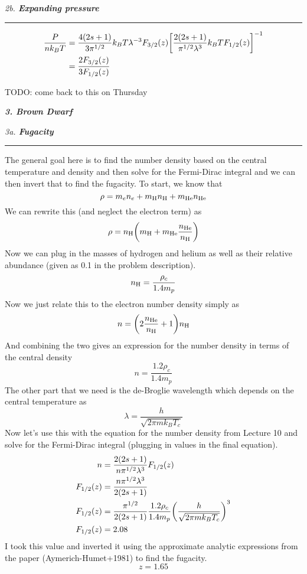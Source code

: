 \documentclass[12pt, letterpaper, twoside]{article}
\newcommand{\question}[1]{{\noindent \it #1}}
\newcommand{\answer}[1]{
    \par\noindent\rule{\textwidth}{0.4pt}#1\vspace{0.5cm}
}
\newcommand{\todo}[1]{{\color{red}\begin{center}TODO: #1\end{center}}}
\begin{document}
\question{2b. \textbf{Expanding pressure}}
\answer{
    \begin{align}
        \frac{P}{n k_B T} &= \frac{4(2s + 1)}{3 \pi^{1/2}} k_B T \lambda^{-3} F_{3/2}(z) \qty[\frac{2(2s + 1)}{\pi^{1/2} \lambda^3} k_B T F_{1/2}(z)]^{-1} \\
                          &= \frac{2 F_{3/2}(z)}{3 F_{1/2}(z)}
    \end{align}
    \todo{come back to this on Thursday}
}

\question{\textbf{3. Brown Dwarf}}

\question{3a. \textbf{Fugacity}}
\answer{
    The general goal here is to find the number density based on the central temperature and density and then solve for the Fermi-Dirac integral and we can then invert that to find the fugacity. To start, we know that
    \begin{equation}
        \rho = m_e n_e + m_{\rm H} n_{\rm H} + m_{\rm He} n_{\rm He}
    \end{equation}
    We can rewrite this (and neglect the electron term) as
    \begin{equation}
        \rho = n_{\rm H} \qty(m_{\rm H} + m_{\rm He} \frac{n_{\rm He}}{n_{\rm H}})
    \end{equation}
    Now we can plug in the masses of hydrogen and helium as well as their relative abundance (given as 0.1 in the problem description).
    \begin{equation}
        n_{\rm H} = \frac{\rho_c}{1.4 m_p}
    \end{equation}
    Now we just relate this to the electron number density simply as
    \begin{equation}
        n = \qty(2 \frac{n_{\rm He}}{n_{\rm H}} + 1) n_{\rm H}
    \end{equation}
    And combining the two gives an expression for the number density in terms of the central density
    \begin{equation}
        n = \frac{1.2 \rho_c}{1.4 m_p}
    \end{equation}
    The other part that we need is the de-Broglie wavelength which depends on the central temperature as
    \begin{equation}
        \lambda = \frac{h}{\sqrt{2 \pi m k_B T_c}}
    \end{equation}
    Now let's use this with the equation for the number density from Lecture 10 and solve for the Fermi-Dirac integral (plugging in values in the final equation).
    \begin{align}
        n &= \frac{2(2s + 1)}{n \pi^{1/2} \lambda^3} F_{1/2}(z) \\
        F_{1/2}(z) &= \frac{n \pi^{1/2} \lambda^3}{2(2s + 1)} \\
        F_{1/2}(z) &= \frac{\pi^{1/2}}{2(2s + 1)} \frac{1.2 \rho_c}{1.4 m_p} \qty(\frac{h}{\sqrt{2 \pi m k_B T_c}})^3 \\
        F_{1/2}(z) &= 2.08
    \end{align}
    I took this value and inverted it using the approximate analytic expressions from the paper (Aymerich-Humet+1981) to find the fugacity.
    \begin{equation}
        \boxed{ z = 1.65 }
    \end{equation}
}
\end{document}
